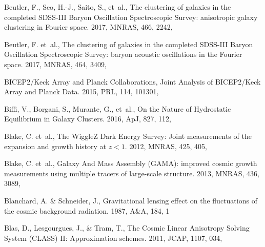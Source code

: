 \documentclass[longauth,traditabstract]{aa}
\def\aap{{A\&A}}
\def\apj{{ApJ}}
\def\mnras{{MNRAS}}
\def\prl{{PRL}}
\def\jcap{{JCAP}}
\begin{document}
\begin{thebibliography}{379}
{Beutler}, F., {Seo}, H.-J., {Saito}, S., {et~al.}, {The clustering of galaxies
  in the completed SDSS-III Baryon Oscillation Spectroscopic Survey:
  anisotropic galaxy clustering in Fourier space}. 2017, \mnras, 466, 2242,

Beutler, F. {et~al.}, {The clustering of galaxies in the completed SDSS-III
  Baryon Oscillation Spectroscopic Survey: baryon acoustic oscillations in the
  Fourier space}. 2017, \mnras, 464, 3409, 

{BICEP2/Keck Array and Planck Collaborations}, {Joint Analysis of BICEP2/Keck
  Array and Planck Data}. 2015, \prl, 114, 101301, 

{Biffi}, V., {Borgani}, S., {Murante}, G., {et~al.}, {On the Nature of
  Hydrostatic Equilibrium in Galaxy Clusters}. 2016, \apj, 827, 112,

Blake, C. {et~al.}, {The WiggleZ Dark Energy Survey: Joint measurements of the
  expansion and growth history at $z < 1$}. 2012, \mnras, 425, 405,

Blake, C. {et~al.}, {Galaxy And Mass Assembly (GAMA): improved cosmic growth
  measurements using multiple tracers of large-scale structure}. 2013, \mnras,
  436, 3089, 

{Blanchard}, A. \& {Schneider}, J., {Gravitational lensing effect on the
  fluctuations of the cosmic background radiation}. 1987, \aap, 184, 1

Blas, D., Lesgourgues, J., \& Tram, T., {The Cosmic Linear Anisotropy Solving
  System (CLASS) II: Approximation schemes}. 2011, \jcap, 1107, 034,


\end{thebibliography}
\end{document}
